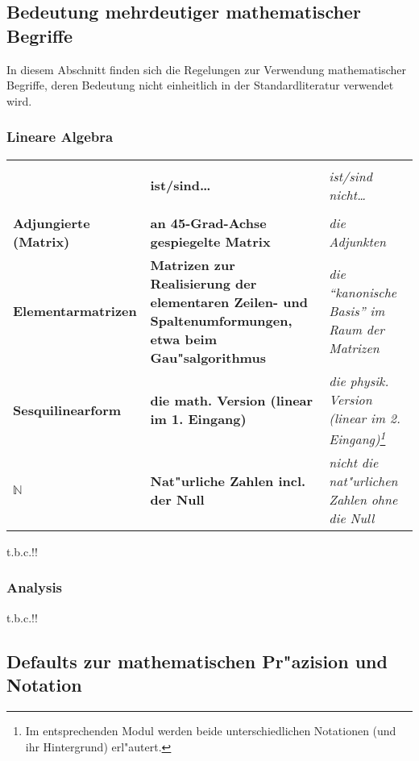 \subsection{Bedeutung mehrdeutiger mathematischer Begriffe}\label{benennung_mehrdeutig_style}

In diesem Abschnitt finden sich die Regelungen zur Verwendung
mathematischer Begriffe, deren Bedeutung nicht einheitlich in der
Standardliteratur verwendet wird.

\subsubsection{Lineare Algebra}

\begin{tabular}{| >{\bfseries}p{45mm} | >{\bfseries}p{40mm} | >{\itshape}p{40mm} |}
\hline
\hline
 & & \\
 & ist/sind\dots & ist/sind nicht\dots \\
 & & \\
\hline
\hline
Adjungierte (Matrix) & an 45-Grad-Achse gespiegelte Matrix & die Adjunkten \\
\hline
Elementarmatrizen & Matrizen zur Realisierung der elementaren Zeilen- und Spaltenumformungen, 
etwa beim Gau"salgorithmus & die ``kanonische Basis'' im Raum der Matrizen\\
\hline
Sesquilinearform & die math. Version (linear im 1. Eingang) & die 
physik. Version (linear im 2. Eingang)\footnote{Im entsprechenden
Modul werden beide unterschiedlichen Notationen (und ihr Hintergrund) erl"autert.}\\
\hline
$\mathbb{N}$ & Nat"urliche Zahlen incl. der Null & nicht die nat"urlichen Zahlen ohne die Null\\
\hline
\hline
\end{tabular}

t.b.c.!!

\subsubsection{Analysis}

t.b.c.!!

\clearpage

\subsection{Defaults zur mathematischen Pr"azision und Notation}\label{math_praezise_style}\label{notation_mathsym_style}

